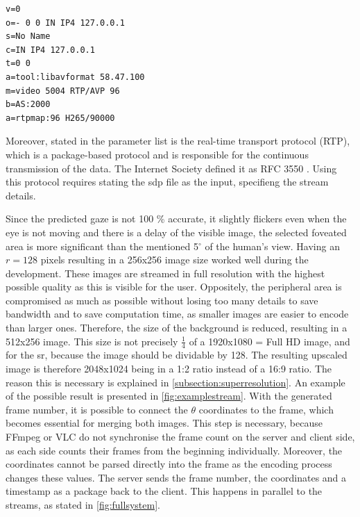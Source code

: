 \begin{minipage}{\linewidth}
\begin{lstlisting}
v=0
o=- 0 0 IN IP4 127.0.0.1
s=No Name
c=IN IP4 127.0.0.1
t=0 0
a=tool:libavformat 58.47.100
m=video 5004 RTP/AVP 96
b=AS:2000
a=rtpmap:96 H265/90000
\end{lstlisting}
\end{minipage}
Moreover, stated in the parameter list is the real-time transport protocol (RTP), which is a package-based protocol and is responsible for the continuous transmission of the data. The Internet Society defined it as RFC 3550 \parencite{Schulzrinne2003}. Using this protocol requires stating the sdp file as the input, specifieng the stream details.

\par
Since the predicted gaze is not 100 \% accurate, it slightly flickers even when the eye is not moving and there is a delay of the visible image, the selected foveated area is more significant than the mentioned 5$^\circ$ of the human’s view. Having an \(r = 128\) pixels resulting in a 256x256 image size worked well during the development. These images are streamed in full resolution with the highest possible quality as this is visible for the user. Oppositely, the peripheral area is compromised as much as possible without losing too many details to save bandwidth and to save computation time, as smaller images are easier to encode than larger ones. Therefore, the size of the background is reduced, resulting in a 512x256 image. This size is not precisely \(\frac{1}{4}\) of a 1920x1080 = Full HD image, and for the \gls{sr}, because the image should be dividable by 128. The resulting upscaled image is therefore 2048x1024 being in a 1:2 ratio instead of a 16:9 ratio. The reason this is necessary is explained in \autoref{subsection:superresolution}. An example of the possible result is presented in \autoref{fig:examplestream}. With the generated frame number, it is possible to connect the \(\theta\) coordinates to the frame, which becomes essential for merging both images. This step is necessary, because FFmpeg or VLC do not synchronise the frame count on the server and client side, as each side counts their frames from the beginning individually. Moreover, the coordinates cannot be parsed directly into the frame as the encoding process changes these values. The server sends the frame number, the coordinates and a timestamp as a package back to the client. This happens in parallel to the streams, as stated in \autoref{fig:fullsystem}.

